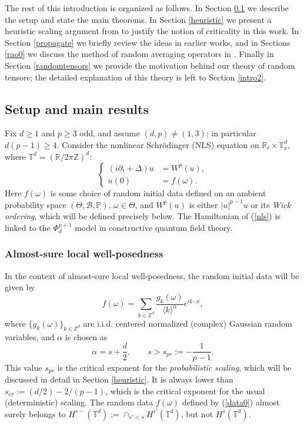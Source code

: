 \documentclass[11 pt,reqno]{amsart}
\theoremstyle{definition}
\theoremstyle{remark}
\numberwithin{equation}{section}
\newcommand{\Bc}{\mathcal{B}}
\newcommand{\Tb}{\mathbb{T}}
\newcommand{\Rb}{\mathbb{R}}
\newcommand{\Zb}{\mathbb{Z}}
\newcommand{\Pb}{\mathbb{P}}
\begin{document}
The rest of this introduction is organized as follows. In Section \ref{setup} we describe the setup and state the main theorems. In Section \ref{heuristic} we present a heuristic scaling argument from \cite{DNY} to justify the notion of criticality in this work. In Section \ref{propagate} we briefly review the ideas in earlier works, and in Sections \ref{rao0} we discuss the method of random averaging operators in \cite{DNY}. Finally in Section \ref{randomtensors} we provide the motivation behind our theory of random tensors; the detailed explanation of this theory is left to Section \ref{intro2}.
\subsection{Setup and main results}\label{setup} Fix $d\geq 1$ and $p\geq 3$ odd, and assume $(d,p)\neq (1,3)$; in particular $d(p-1)\geq 4$. Consider the nonlinear Schr\"{o}dinger (NLS) equation on $\Rb_t\times\Tb_x^d$, where $\Tb^d=(\Rb/2\pi\Zb)^d$: \begin{equation}\label{nls}
\left\{
\begin{aligned}(i\partial_t+\Delta)u&=W^p(u),\\
u(0)&=f(\omega).
\end{aligned}
\right.
\end{equation} Here $f(\omega)$ is some choice of random initial data defined on an ambient probability space $(\Theta,\Bc,\Pb)$, $\omega\in\Theta$, and $W^p(u)$ is either $|u|^{p-1}u$ or its \emph{Wick ordering}, which will be defined precisely below. The Hamiltonian of (\ref{nls}) is linked to the $\Phi_d^{p+1}$ model in constructive quantum field theory.
\subsubsection{Almost-sure local well-posedness} In the context of almost-sure local well-posedness, the random initial data will be given by \begin{equation}\label{data0}f(\omega)=\sum_{k\in\Zb^d}\frac{g_k(\omega)}{\langle k\rangle^\alpha}e^{ik\cdot x},
 \end{equation} where $\{g_k(\omega)\}_{k\in\Zb^d}$ are i.i.d. centered normalized (complex) Gaussian random variables, and $\alpha$ is chosen as \begin{equation}\label{choicealpha}\alpha=s+\frac{d}{2},\qquad s>s_{pr}:=-\frac{1}{p-1}.\end{equation} This value $s_{pr}$ is the critical exponent for the \emph{probabilistic scaling}, which will be discussed in detail in Section \ref{heuristic}. It is always lower than $s_{cr}:=(d/2)-2/(p-1)$, which is the critical exponent for the usual (deterministic) scaling. The random data $f(\omega)$ defined by (\ref{data0}) almost surely belongs to $H^{s-}(\Tb^d):=\cap_{s'<s}H^{s'}(\Tb^d)$, but not $H^s(\Tb^d)$.
 
\end{document}

